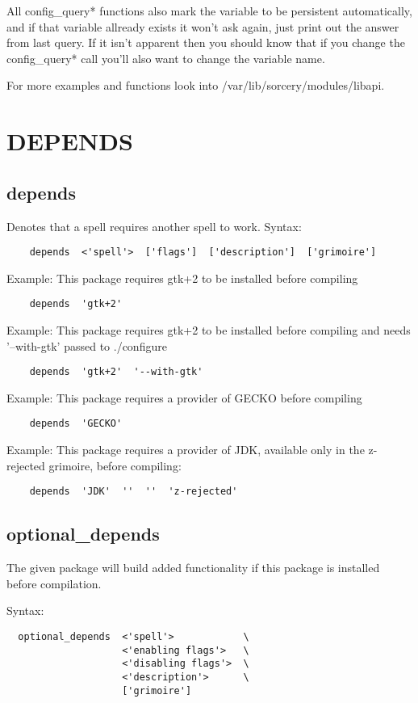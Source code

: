 \documentclass[a4paper,10pt]{book}
\begin{document}
All config\_query* functions also mark the variable to be persistent
automatically, and if that variable allready exists it won't ask again, just
print out the answer from last query. If it isn't apparent then you should know
that if you change the config\_query* call you'll also want to change the
variable name.

For more examples and functions look into /var/lib/sorcery/modules/libapi.

\section{DEPENDS}
\subsection{depends}
Denotes that a spell requires another spell to work.
Syntax:
\begin{verbatim}
	depends  <'spell'>  ['flags']  ['description']  ['grimoire']
\end{verbatim}


Example: This package requires gtk+2 to be installed before compiling
\begin{verbatim}
	depends  'gtk+2'
\end{verbatim}

Example: This package requires gtk+2 to be installed before compiling and
needs '--with-gtk' passed to ./configure
\begin{verbatim}
	depends  'gtk+2'  '--with-gtk'
\end{verbatim}

Example: This package requires a provider of GECKO before compiling
\begin{verbatim}
	depends  'GECKO'
\end{verbatim}

Example: This package requires a provider of JDK, available only in the
z-rejected grimoire, before compiling:
\begin{verbatim}
	depends  'JDK'  ''  ''  'z-rejected'
\end{verbatim}


\subsection{optional\_depends}
The given package will build added functionality if this package is installed
before compilation.

Syntax:
\begin{verbatim}
  optional_depends  <'spell'>            \
                    <'enabling flags'>   \
                    <'disabling flags'>  \
                    <'description'>      \
                    ['grimoire']
\end{verbatim}
\end{document}
